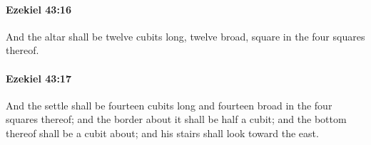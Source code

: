 		\paragraph{Ezekiel 43:16} %
			\label{EZEKIEL-43-16}

			And the altar shall be twelve cubits long, twelve broad, square in the four squares thereof.


		\paragraph{Ezekiel 43:17} %
			\label{EZEKIEL-43-17}

			And the settle shall be fourteen cubits long and fourteen broad in the four squares thereof; and the border about it shall be half a cubit; and the bottom thereof shall be a cubit about; and his stairs shall look toward the east.


